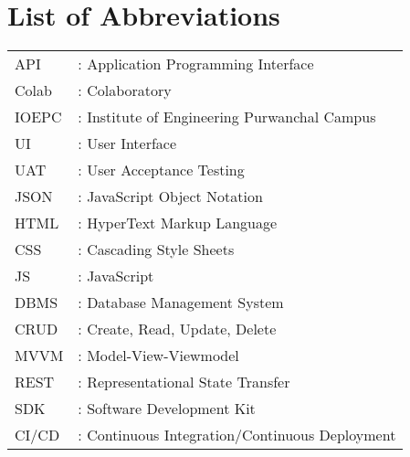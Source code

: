\newpage
\chapter*{List of Abbreviations}
\begin{tabular}{l l}
API	&	:	Application Programming Interface	\\
Colab	&	:	Colaboratory	\\
IOEPC	&	:	Institute of Engineering Purwanchal Campus	\\
UI	&	:	User Interface	\\
UAT	&	:	User Acceptance Testing	\\
JSON	&	:	JavaScript Object Notation	\\
HTML	&	:	HyperText Markup Language	\\
CSS	&	:	Cascading Style Sheets	\\
JS	&	:	JavaScript	\\
DBMS	&	:	Database Management System	\\
CRUD	&	:	Create, Read, Update, Delete	\\
MVVM	&	:	Model-View-Viewmodel	\\
REST	&	:	Representational State Transfer	\\
SDK	&	:	Software Development Kit	\\
CI/CD	&	:	Continuous Integration/Continuous Deployment	\\
\end{tabular}